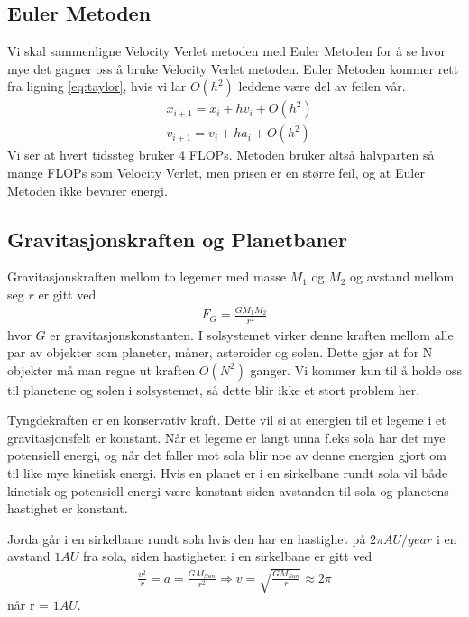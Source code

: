 \documentclass[reprint,english,notitlepage]{revtex4-1}
\begin{document}
\subsection{Euler Metoden}
	Vi skal sammenligne Velocity Verlet metoden med Euler Metoden for å se hvor mye det gagner oss å bruke Velocity Verlet metoden. Euler Metoden kommer rett fra ligning \ref{eq:taylor}, hvis vi lar $O(h^2)$ leddene være del av feilen vår.
	\begin{equation}
	\begin{aligned}
	&x_{i+1} = x_i + h v_i + O(h^2) \\
	&v_{i+1} = v_i + h a_i + O(h^2)
	\end{aligned}
	\end{equation}
	Vi ser at hvert tidssteg bruker 4 FLOPs. Metoden bruker altså halvparten så mange FLOPs som Velocity Verlet, men prisen er en større feil, og at Euler Metoden ikke bevarer energi.
	
\subsection{Gravitasjonskraften og Planetbaner}
	Gravitasjonskraften mellom to legemer med masse $M_1$ og $M_2$ og avstand mellom seg $r$ er gitt ved
	\begin{equation}
	\begin{aligned}
	F_G = \frac{GM_1M_2}{r^2}
	\end{aligned}
	\end{equation}
	hvor $G$ er gravitasjonskonstanten. I solsystemet virker denne kraften mellom alle par av objekter som planeter, måner, asteroider og solen. Dette gjør at for N objekter må man regne ut kraften $O(N^2)$ ganger. Vi kommer kun til å holde oss til planetene og solen i solsystemet, så dette blir ikke et stort problem her.
	
	Tyngdekraften er en konservativ kraft. Dette vil si at energien til et legeme i et gravitasjonsfelt er konstant. Når et legeme er langt unna f.eks sola har det mye potensiell energi, og når det faller mot sola blir noe av denne energien gjort om til like mye kinetisk energi. Hvis en planet er i en sirkelbane rundt sola vil både kinetisk og potensiell energi være konstant siden avstanden til sola og planetens hastighet er konstant.
	
	Jorda går i en sirkelbane rundt sola hvis den har en hastighet på $2\pi AU/year$ i en avstand $1 AU$ fra sola, siden hastigheten i en sirkelbane er gitt ved
	\begin{equation}
	\begin{aligned}
	\frac{v^2}{r} = a = \frac{GM_{Sun}}{r^2} \Rightarrow v = \sqrt{\frac{GM_{Sun}}{r}} \approx 2\pi
	\end{aligned}
	\end{equation}
	når r = $1 AU$.
	
\end{document}
